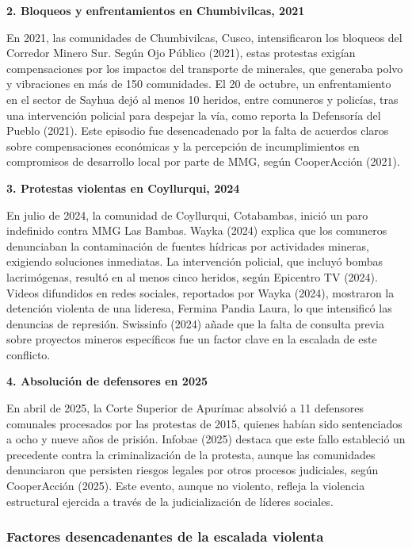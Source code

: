 \documentclass[
  stu,
  floatsintext,
  longtable,
  a4paper,
  nolmodern,
  notxfonts,
  notimes,
  colorlinks=true,linkcolor=blue,citecolor=blue,urlcolor=blue]{apa7}
\begin{document}
\textbf{2. Bloqueos y enfrentamientos en Chumbivilcas, 2021}

En 2021, las comunidades de Chumbivilcas, Cusco, intensificaron los
bloqueos del Corredor Minero Sur. Según Ojo Público (2021), estas
protestas exigían compensaciones por los impactos del transporte de
minerales, que generaba polvo y vibraciones en más de 150 comunidades.
El 20 de octubre, un enfrentamiento en el sector de Sayhua dejó al menos
10 heridos, entre comuneros y policías, tras una intervención policial
para despejar la vía, como reporta la Defensoría del Pueblo (2021). Este
episodio fue desencadenado por la falta de acuerdos claros sobre
compensaciones económicas y la percepción de incumplimientos en
compromisos de desarrollo local por parte de MMG, según CooperAcción
(2021).

\textbf{3. Protestas violentas en Coyllurqui, 2024}

En julio de 2024, la comunidad de Coyllurqui, Cotabambas, inició un paro
indefinido contra MMG Las Bambas. Wayka (2024) explica que los comuneros
denunciaban la contaminación de fuentes hídricas por actividades
mineras, exigiendo soluciones inmediatas. La intervención policial, que
incluyó bombas lacrimógenas, resultó en al menos cinco heridos, según
Epicentro TV (2024). Videos difundidos en redes sociales, reportados por
Wayka (2024), mostraron la detención violenta de una lideresa, Fermina
Pandia Laura, lo que intensificó las denuncias de represión. Swissinfo
(2024) añade que la falta de consulta previa sobre proyectos mineros
específicos fue un factor clave en la escalada de este conflicto.

\textbf{4. Absolución de defensores en 2025}

En abril de 2025, la Corte Superior de Apurímac absolvió a 11 defensores
comunales procesados por las protestas de 2015, quienes habían sido
sentenciados a ocho y nueve años de prisión. Infobae (2025) destaca que
este fallo estableció un precedente contra la criminalización de la
protesta, aunque las comunidades denunciaron que persisten riesgos
legales por otros procesos judiciales, según CooperAcción (2025). Este
evento, aunque no violento, refleja la violencia estructural ejercida a
través de la judicialización de líderes sociales.

\subsubsection{Factores desencadenantes de la escalada
violenta}\label{factores-desencadenantes-de-la-escalada-violenta}
\end{document}
